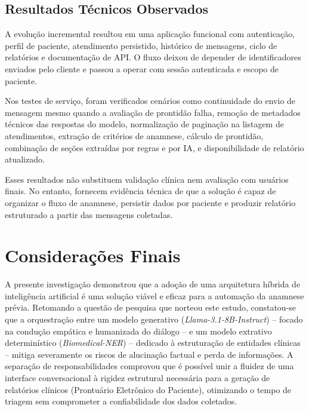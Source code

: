 \section{Resultados Técnicos Observados}

A evolução incremental resultou em uma aplicação funcional com autenticação, perfil de
paciente, atendimento persistido, histórico de mensagens, ciclo de relatórios e documentação
de API. O fluxo deixou de depender de identificadores enviados pelo cliente e passou a operar
com sessão autenticada e escopo de paciente.

Nos testes de serviço, foram verificados cenários como continuidade do envio de mensagem
mesmo quando a avaliação de prontidão falha, remoção de metadados técnicos das respostas do
modelo, normalização de paginação na listagem de atendimentos, extração de critérios de
anamnese, cálculo de prontidão, combinação de seções extraídas por regras e por IA, e
disponibilidade de relatório atualizado.

Esses resultados não substituem validação clínica nem avaliação com usuários finais. No
entanto, fornecem evidência técnica de que a solução é capaz de organizar o fluxo de
anamnese, persistir dados por paciente e produzir relatório estruturado a partir das mensagens
coletadas.

\chapter{Considerações Finais}
\label{cap:consideracoes}

A presente investigação demonstrou que a adoção de uma arquitetura híbrida de inteligência artificial é uma solução viável e eficaz para a automação da anamnese prévia. Retomando a questão de pesquisa que norteou este estudo, constatou-se que a orquestração entre um modelo generativo (\textit{Llama-3.1-8B-Instruct}) -- focado na condução empática e humanizada do diálogo -- e um modelo extrativo determinístico (\textit{Biomedical-NER}) -- dedicado à estruturação de entidades clínicas -- mitiga severamente os riscos de alucinação factual e perda de informações. A separação de responsabilidades comprovou que é possível unir a fluidez de uma interface conversacional à rigidez estrutural necessária para a geração de relatórios clínicos (Prontuário Eletrônico do Paciente), otimizando o tempo de triagem sem comprometer a confiabilidade dos dados coletados.


